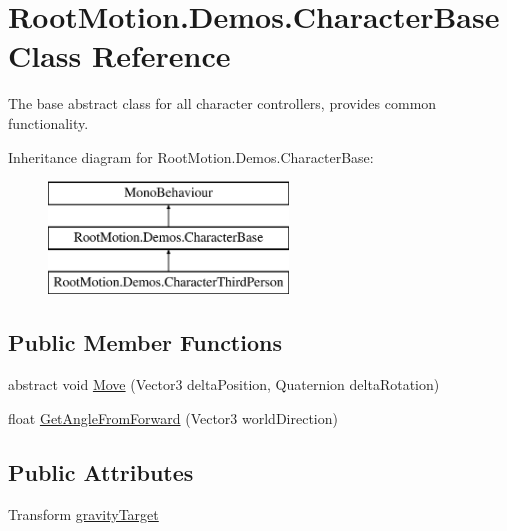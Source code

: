 \hypertarget{class_root_motion_1_1_demos_1_1_character_base}{}\section{Root\+Motion.\+Demos.\+Character\+Base Class Reference}
\label{class_root_motion_1_1_demos_1_1_character_base}


The base abstract class for all character controllers, provides common functionality.  


Inheritance diagram for Root\+Motion.\+Demos.\+Character\+Base\+:\begin{figure}[H]
\begin{center}
\leavevmode
\includegraphics[height=3.000000cm]{class_root_motion_1_1_demos_1_1_character_base}
\end{center}
\end{figure}
\subsection*{Public Member Functions}
\begin{DoxyCompactItemize}
\item 
abstract void \mbox{\hyperlink{class_root_motion_1_1_demos_1_1_character_base_aef8d13b7c1e76de057486d81a6f3d0cb}{Move}} (Vector3 delta\+Position, Quaternion delta\+Rotation)
\item 
float \mbox{\hyperlink{class_root_motion_1_1_demos_1_1_character_base_a03c29b9eeaf29a2591eeb45edeab8483}{Get\+Angle\+From\+Forward}} (Vector3 world\+Direction)
\end{DoxyCompactItemize}
\subsection*{Public Attributes}
\begin{DoxyCompactItemize}
\item 
Transform \mbox{\hyperlink{class_root_motion_1_1_demos_1_1_character_base_a87ce3c9ca7132d08c120c9aff957d52b}{gravity\+Target}}
\end{DoxyCompactItemize}
